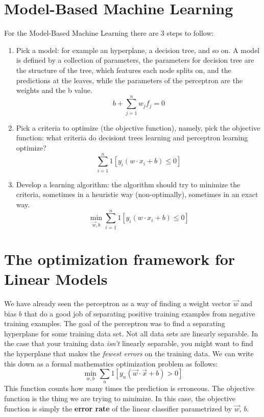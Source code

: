 \section{Model-Based Machine Learning}
For the Model-Based Machine Learning there are 3 steps to follow:
\begin{enumerate}
    \item Pick a model: for example an hyperplane, a decision tree, and so on. A model is defined by a collection of parameters, the parameters for decision tree are the structure of the tree, which features each node splits on, and the predictions at the leaves, while the parameters of the perceptron are the weights and the b value.
    \begin{equation}
        b + \sum_{j=1}^n w_jf_j = 0
    \end{equation}
    \item Pick a criteria to optimize (the objective function), namely, pick the objective function: what criteria do decisiont trees learning and perceptron learning optimize?
    \begin{equation}
        \sum_{i=1}^n 1 \left[ y_i(w \cdot x_i + b) \leq 0 \right]
    \end{equation}
    \item Develop a learning algorithm: the algorithm should try to minimize the criteria, sometimes in a heuristic way (non-optimally), sometimes in an exact way.
    \begin{equation}
        \min_{\vec{w},b} \sum_{i=1}^n1 \left[ y_i(w \cdot x_i + b) \leq 0 \right]
    \end{equation}
\end{enumerate}

\section{The optimization framework for Linear Models}
We have already seen the perceptron as a way of finding a weight vector \(\vec{w}\) and bias \(b\) that do a good job of separating positive training examples from negative training examples. The goal of the perceptron was to find a separating hyperplane for some training data set. Not all data sets are linearly separable. In the case that your training data \emph{isn't} linearly separable, you might want to find the hyperplane that makes the \emph{fewest errors} on the training data. We can write this down as a formal mathematics optimization problem as follows:
\begin{equation}
    \label{eqn:optimization}
    \min_{w,b} \sum_n 1[y_n(\vec{w} \cdot \vec{x} + b) > 0]
\end{equation}
This function counts how many times the prediction is erroneous. The objective function is the thing we are trying to minimize. In this case, the objective function is simply the \textbf{error rate} of the linear classifier parametrized by \(\vec{w}\), \(b\).

